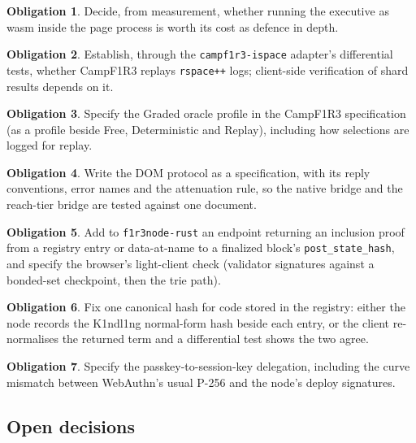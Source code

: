 \documentclass[11pt]{article}
\theoremstyle{definition}
\newtheorem{obligation}{Obligation}
\theoremstyle{remark}
\newcommand{\Camp}{CampF1R3}
\newcommand{\Kind}{K1ndl1ng}
\newcommand{\code}[1]{\texttt{#1}}
\begin{document}
\begin{obligation}\label{ob:wasmdepth}
Decide, from measurement, whether running the executive as wasm inside the page process
is worth its cost as defence in depth.
\end{obligation}

\begin{obligation}\label{ob:replay}
Establish, through the \code{campf1r3-ispace} adapter's differential tests, whether
\Camp{} replays \code{rspace++} logs; client-side verification of shard results depends
on it.
\end{obligation}

\begin{obligation}\label{ob:graded}
Specify the Graded oracle profile in the \Camp{} specification (as a profile beside Free,
Deterministic and Replay), including how selections are logged for replay.
\end{obligation}

\begin{obligation}\label{ob:proto}
Write the DOM protocol as a specification, with its reply conventions, error names and
the attenuation rule, so the native bridge and the reach-tier bridge are tested against
one document.
\end{obligation}

\begin{obligation}\label{ob:proofs}
Add to \code{f1r3node-rust} an endpoint returning an inclusion proof from a registry
entry or data-at-name to a finalized block's \code{post\_state\_hash}, and specify the
browser's light-client check (validator signatures against a bonded-set checkpoint,
then the trie path).
\end{obligation}

\begin{obligation}\label{ob:hashes}
Fix one canonical hash for code stored in the registry: either the node records the
\Kind{} normal-form hash beside each entry, or the client re-normalises the returned term
and a differential test shows the two agree.
\end{obligation}

\begin{obligation}\label{ob:passkey}
Specify the passkey-to-session-key delegation, including the curve mismatch between
WebAuthn's usual P-256 and the node's deploy signatures.
\end{obligation}

\subsection{Open decisions}
\end{document}
